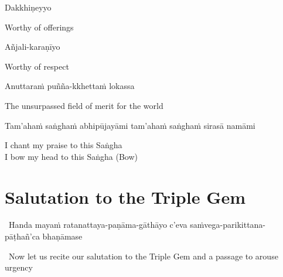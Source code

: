 Dakkhiṇeyyo

\begin{english}
  Worthy of offerings
\end{english}

\ifbfive\clearpage\fi

Añjali-karaṇīyo

\begin{english}
  Worthy of respect
\end{english}

Anuttaraṁ puñña-kkhettaṁ lokassa

\begin{english}
  The unsurpassed field of merit for the world\ifdigital\makeatletter\hyperlink{endnote149-appendix}\makeatother\fi
\end{english}

\suttaRef{[SN 12.41]}

\begin{pali-hang}
  Tam'ahaṁ saṅghaṁ abhipūjayāmi tam'ahaṁ saṅghaṁ sirasā namāmi
\end{pali-hang}

\begin{english}
  I chant my praise to this Saṅgha\\
  I bow my head to this Saṅgha \hfill{\textnormal{\ifafive\fontsize{12.5}{18}\fi\ifninebythirteen\fontsize{9}{13}\fi\selectfont (Bow)}}
\end{english}

\suttaRef{[Thai]}



\section{Salutation to the Triple Gem}
\label{salutation}

\begin{leader}
  \anglebracketleft\ \hspace{-0.5mm}Handa mayaṁ ratanattaya-paṇāma-gāthāyo c'eva saṁvega-parikittana-pāṭhañ'ca bhaṇāmase \hspace{-0.5mm}\anglebracketright\
\end{leader}
\begin{leader-english-below-pali}
  \anglebracketleft\ \hspace{-0.5mm}Now let us recite our salutation to the Triple Gem and a passage to arouse urgency \hspace{-0.5mm}\anglebracketright\
\end{leader-english-below-pali}

